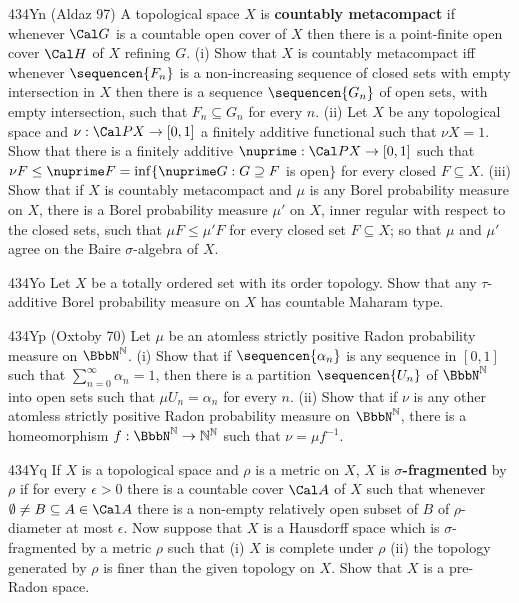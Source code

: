 {\spheader 434Yn ({\smc Aldaz 97}) A topological space $X$ is {\bf
countably metacompact} if whenever $\Cal G$ is a countable open cover of
$X$ then there is a point-finite open cover $\Cal H$ of $X$ refining
$G$.
(i) Show that $X$ is countably metacompact iff whenever
$\sequencen{F_n}$ is a
non-increasing sequence of closed sets with empty intersection in $X$
then there is a sequence $\sequencen{G_n}$ of open sets, with empty
intersection, such that $F_n\subseteq G_n$ for every $n$.
(ii) Let $X$
be any topological space and $\nu:\Cal PX\to[0,1]$ a finitely additive
functional such that $\nu X=1$.   Show that there is a finitely additive
$\nuprime:\Cal PX\to[0,1]$ such that
$\nu F\le\nuprime F=\inf\{\nuprime G:G\supseteq F$ is open$\}$ for every
closed $F\subseteq X$.   
(iii) Show that if $X$ is countably metacompact and $\mu$ is any Borel
probability measure on $X$, there is a Borel probability measure $\mu'$
on $X$, inner regular with respect to the closed sets, such that
$\mu F\le\mu' F$ for every closed set $F\subseteq X$;  so that $\mu$ and
$\mu'$ agree on the Baire $\sigma$-algebra of $X$.

\spheader 434Yo Let $X$ be a totally ordered set with its order
topology.   Show that any $\tau$-additive Borel probability measure on
$X$ has countable Maharam type.

\spheader 434Yp ({\smc Oxtoby 70}) Let $\mu$ be an atomless strictly 
positive 
Radon probability measure on $\BbbN^{\Bbb N}$.   (i) Show that if 
$\sequencen{\alpha_n}$ is any sequence in $[0,1]$ such that 
$\sum_{n=0}^{\infty}\alpha_n=1$, then there is a partition $\sequencen{U_n}$ of 
$\BbbN^{\Bbb N}$ into open sets such that 
$\mu U_n=\alpha_n$ for every $n$.   (ii) Show that if $\nu$ is any other 
atomless strictly positive Radon probability measure on 
$\BbbN^{\Bbb N}$, there is a homeomorphism 
$f:\BbbN^{\Bbb N}\to\Bbb N^{\Bbb N}$ such that $\nu=\mu f^{-1}$.

\spheader 434Yq If $X$ is a topological space and $\rho$ is a metric on
$X$, $X$ is {\bf$\sigma$-fragmented} by $\rho$ if for every $\epsilon>0$
there is a countable cover $\Cal A$ of $X$ such that whenever 
$\emptyset\ne B\subseteq A\in\Cal A$ there is a non-empty relatively open
subset of $B$ of $\rho$-diameter at most $\epsilon$.   Now suppose that $X$
is a Hausdorff space which is $\sigma$-fragmented by a metric $\rho$ such
that (i) $X$ is complete under $\rho$ (ii) the topology generated by $\rho$
is finer than the given topology on $X$.   Show that $X$ is a pre-Radon
space.

}
